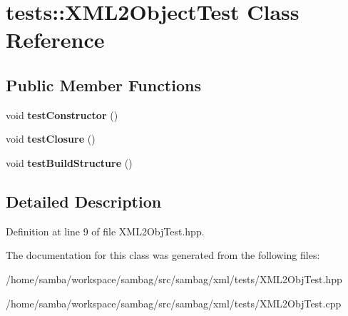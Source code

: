\hypertarget{classtests_1_1_x_m_l2_object_test}{
\section{tests::XML2ObjectTest Class Reference}
\label{classtests_1_1_x_m_l2_object_test}
}
\subsection*{Public Member Functions}
\begin{DoxyCompactItemize}
\item 
\hypertarget{classtests_1_1_x_m_l2_object_test_a12a2155ad9dbec14c1e042c891ba7b31}{
void {\bfseries testConstructor} ()}
\label{classtests_1_1_x_m_l2_object_test_a12a2155ad9dbec14c1e042c891ba7b31}

\item 
\hypertarget{classtests_1_1_x_m_l2_object_test_acbcfa190ed0e035734af24e43af81172}{
void {\bfseries testClosure} ()}
\label{classtests_1_1_x_m_l2_object_test_acbcfa190ed0e035734af24e43af81172}

\item 
\hypertarget{classtests_1_1_x_m_l2_object_test_a93e51a8b879a976b36a472c4349d7b9c}{
void {\bfseries testBuildStructure} ()}
\label{classtests_1_1_x_m_l2_object_test_a93e51a8b879a976b36a472c4349d7b9c}

\end{DoxyCompactItemize}


\subsection{Detailed Description}


Definition at line 9 of file XML2ObjTest.hpp.



The documentation for this class was generated from the following files:\begin{DoxyCompactItemize}
\item 
/home/samba/workspace/sambag/src/sambag/xml/tests/XML2ObjTest.hpp\item 
/home/samba/workspace/sambag/src/sambag/xml/tests/XML2ObjTest.cpp\end{DoxyCompactItemize}
